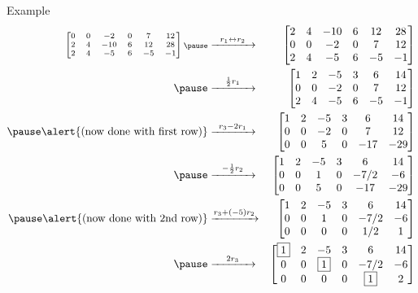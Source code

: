 \begin{frame}{Example}
\footnotesize
\begin{eqnarray*}
\scriptsize
\begin{bmatrix}
0&0&-2&0&7&12\\
2&4&-10&6&12&28\\
2&4&-5&6&-5&-1
\end{bmatrix}
\pause&\xrightarrow[\hspace{35pt}]{r_1\leftrightarrow r_2}&
\begin{bmatrix}
2&4&-10&6&12&28\\
0&0&-2&0&7&12\\
2&4&-5&6&-5&-1
\end{bmatrix}
\\
\pause&\xrightarrow[\hspace{35pt}]{\frac{1}{2}r_1}&
\begin{bmatrix}
1&2&-5&3&6&14\\
0&0&-2&0&7&12\\
2&4&-5&6&-5&-1
\end{bmatrix}
\\
\pause \alert{\text{(now done with first row)}}&\xrightarrow[\hspace{35pt}]{r_3-2r_1}&
\begin{bmatrix}
1&2&-5&3&6&14\\
0&0&-2&0&7&12\\
0&0&5&0&-17&-29
\end{bmatrix}
\\
\pause&\xrightarrow[\hspace{35pt}]{-\frac{1}{2}r_2}&
\begin{bmatrix}
1&2&-5&3&6&14\\
0&0&1&0&-7/2&-6\\
0&0&5&0&-17&-29
\end{bmatrix}
\\
\pause \alert{\text{(now done with 2nd row)}}&\xrightarrow[\hspace{35pt}]{r_3+(-5)r_2}&
\begin{bmatrix}
1&2&-5&3&6&14\\
0&0&1&0&-7/2&-6\\
0&0&0&0&1/2&1
\end{bmatrix}
\\
\pause&\xrightarrow[\hspace{35pt}]{2r_3}&
\begin{bmatrix}
\boxed{1}&2&-5&3&6&14\\
0&0&\boxed{1}&0&-7/2&-6\\
0&0&0&0&\boxed{1}&2
\end{bmatrix}
\end{eqnarray*}

\end{frame}
